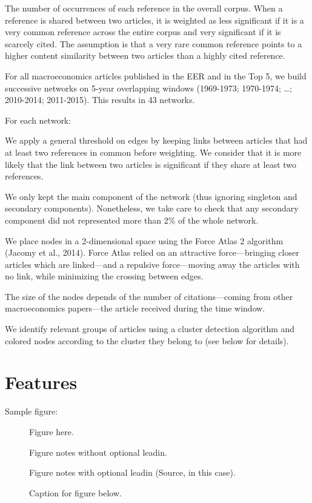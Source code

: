 \documentclass[JEL]{AEA}
\begin{document}
The number of occurrences of each reference in the overall corpus. When
a reference is shared between two articles, it is weighted as less
significant if it is a very common reference across the entire corpus
and very significant if it is scarcely cited. The assumption is that a
very rare common reference points to a higher content similarity between
two articles than a highly cited reference.

For all macroeconomics articles published in the EER and in the Top 5,
we build successive networks on 5-year overlapping windows (1969-1973;
1970-1974; \ldots; 2010-2014; 2011-2015). This results in 43 networks.

For each network:

We apply a general threshold on edges by keeping links between articles
that had at least two references in common before weighting. We consider
that it is more likely that the link between two articles is significant
if they share at least two references.

We only kept the main component of the network (thus ignoring singleton
and secondary components). Nonetheless, we take care to check that any
secondary component did not represented more than 2\% of the whole
network.

We place nodes in a 2-dimensional space using the Force Atlas 2
algorithm (Jacomy et al., 2014). Force Atlas relied on an attractive
force---bringing closer articles which are linked---and a repulsive
force---moving away the articles with no link, while minimizing the
crossing between edges.

The size of the nodes depends of the number of citations---coming from
other macroeconomics papers---the article received during the time
window.

We identify relevant groups of articles using a cluster detection
algorithm and colored nodes according to the cluster they belong to (see
below for details).

\section{Features}

Sample figure:

\begin{figure}
Figure here.

\caption{Caption for figure below.}
\begin{figurenotes}
Figure notes without optional leadin.
\end{figurenotes}
\begin{figurenotes}[Source]
Figure notes with optional leadin (Source, in this case).
\end{figurenotes}
\end{figure}
\end{document}
